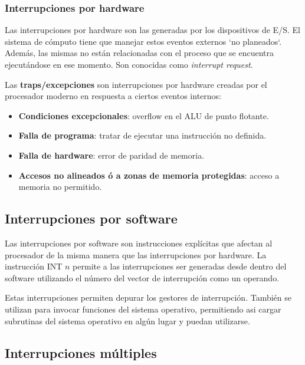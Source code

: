 \begin{subs}
  \subsubsection{Interrupciones por hardware}
  
  Las interrupciones por hardware son las generadas por los dispositivos de E/S. El sistema de cómputo tiene que manejar estos eventos externos `no planeados`. Además, las mismas no están relacionadas con el proceso que se encuentra ejecutándose en ese momento. Son conocidas como \textit{interrupt request}.

  Las \textbf{traps/excepciones} son interrupciones por hardware creadas por el procesador moderno en respuesta a ciertos eventos internos:

  \begin{itemize}
    \item \textbf{Condiciones excepcionales}: overflow en el ALU de punto flotante.
    \item \textbf{Falla de programa}: tratar de ejecutar una instrucción no definida.
    \item \textbf{Falla de hardware}: error de paridad de memoria.
    \item \textbf{Accesos no alineados ó a zonas de memoria protegidas}: acceso a memoria no permitido.
  \end{itemize}

  \subsection{Interrupciones por software}

  Las interrupciones por software son instrucciones explícitas que afectan al procesador de la misma manera que las interrupciones por hardware. La instrucción INT $n$ permite a las interrupciones ser generadas desde dentro del software utilizando el número del vector de interrupción como un operando.

  Estas interrupciones permiten depurar los gestores de interrupción. También se utilizan para invocar funciones del sistema operativo, permitiendo asi cargar subrutinas del sistema operativo en algún lugar y puedan utilizarse.
\end{subs}

\subsection{Interrupciones múltiples}

